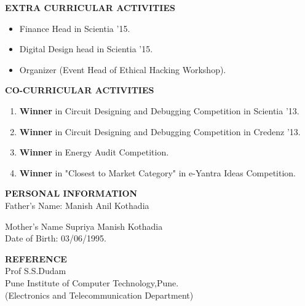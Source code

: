 \documentclass[]{article}
\begin{document}
\begin{flushleft}
\vspace{0.15in}
{\large \bf EXTRA CURRICULAR ACTIVITIES}
\begin{itemize}
\hspace{0.5in}
\vspace{-0.22in}
\addtolength{\itemindent}{1in}
\item Finance Head in Scientia '15.
\item Digital Design head in Scientia '15.
\item Organizer (Event Head of Ethical Hacking Workshop).
\end{itemize}
\end{flushleft}


\begin{flushleft}
\vspace{0.15in}
{\large \bf CO-CURRICULAR ACTIVITIES}
\begin{enumerate}
\hspace{0.5in}
\vspace{-0.22in}
\addtolength{\itemindent}{1in}
\item {\bf Winner} in Circuit Designing and Debugging Competition in Scientia '13.
\item {\bf Winner} in Circuit Designing and Debugging Competition in Credenz '13.
\item {\bf Winner} in Energy Audit Competition.
\item {\bf Winner} in "Closest to Market Category" in e-Yantra Ideas Competition. 
\end{enumerate}
\end{flushleft}


\begin{flushleft}
\vspace{0.15in}
{\large \bf PERSONAL INFORMATION}\\
\vspace{0.15in}
Father's Name:
\hspace{0.5in}
Manish Anil Kothadia
\vspace{0.15in}


Mother's Name
\hspace{0.5in}
Supriya Manish Kothadia\\
\vspace{0.15in}
Date of Birth:
\hspace{0.5in}
03/06/1995.
\end{flushleft}


\begin{flushleft}
\vspace{0.15in}
{\large \bf REFERENCE}\\
\hspace{0.25in}
\hspace{1.2in} Prof S.S.Dudam \\
\hspace{1.5in} Pune Institute of Computer Technology,Pune.\\
\hspace{1.5in} (Electronics and Telecommunication Department)
\end{flushleft}
\end{document}
